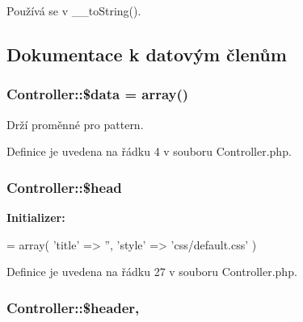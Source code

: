 Používá se v \-\_\-\-\_\-to\-String().



\subsection{Dokumentace k datovým členům}
\hypertarget{class_controller_ac9073fdd6603617ab015c968f0add014}{
\subsubsection[{\$data}]{\setlength{\rightskip}{0pt plus 5cm}Controller\-::\$data = array()\hspace{0.3cm}{\ttfamily [protected]}}}\label{class_controller_ac9073fdd6603617ab015c968f0add014}
Drží proměnné pro pattern. 

Definice je uvedena na řádku 4 v souboru Controller.\-php.

\hypertarget{class_controller_a69fa8da70e30696113dd91420b680f42}{
\subsubsection[{\$head}]{\setlength{\rightskip}{0pt plus 5cm}Controller\-::\$head\hspace{0.3cm}{\ttfamily [protected]}}}\label{class_controller_a69fa8da70e30696113dd91420b680f42}
{\bfseries Initializer\-:}
\begin{DoxyCode}
= array(
        \textcolor{stringliteral}{'title'} => \textcolor{stringliteral}{''},
        \textcolor{stringliteral}{'style'} => \textcolor{stringliteral}{'css/default.css'}
    )
\end{DoxyCode}


Definice je uvedena na řádku 27 v souboru Controller.\-php.

\hypertarget{class_controller_af3a3a4c0b2661eaae8e21eb0a1cce7d5}{
\subsubsection[{\$header}]{\setlength{\rightskip}{0pt plus 5cm}Controller\-::\$header\hspace{0.3cm}{\ttfamily [static]}, {\ttfamily [protected]}}}\label{class_controller_af3a3a4c0b2661eaae8e21eb0a1cce7d5}


